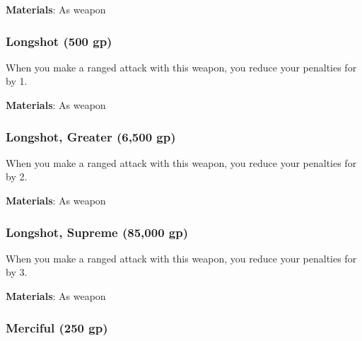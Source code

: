 \vspace{0.25em}
\textbf{Materials}: As weapon


\lowercase{\hypertarget{item:Longshot}{}}\label{item:Longshot}
\hypertarget{item:Longshot}{\subsubsection{Longshot\hfill{} (500 gp)}}

When you make a ranged attack with this weapon, you reduce your penalties for  by 1.



\vspace{0.25em}
\textbf{Materials}: As weapon


\lowercase{\hypertarget{item:Longshot, Greater}{}}\label{item:Longshot, Greater}
\hypertarget{item:Longshot, Greater}{\subsubsection{Longshot, Greater\hfill{} (6,500 gp)}}

When you make a ranged attack with this weapon, you reduce your penalties for  by 2.



\vspace{0.25em}
\textbf{Materials}: As weapon


\lowercase{\hypertarget{item:Longshot, Supreme}{}}\label{item:Longshot, Supreme}
\hypertarget{item:Longshot, Supreme}{\subsubsection{Longshot, Supreme\hfill{} (85,000 gp)}}

When you make a ranged attack with this weapon, you reduce your penalties for  by 3.



\vspace{0.25em}
\textbf{Materials}: As weapon


\lowercase{\hypertarget{item:Merciful}{}}\label{item:Merciful}
\hypertarget{item:Merciful}{\subsubsection{Merciful\hfill{} (250 gp)}}

